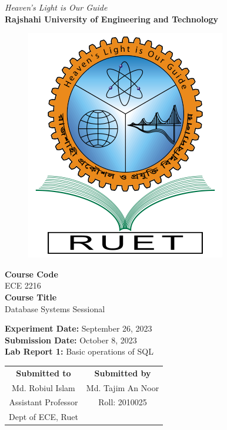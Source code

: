 \vspace*{\fill}
\begin{center}

    \emph{Heaven's Light is Our Guide} \\
    \textbf{Rajshahi University of Engineering and Technology} \\

    \begin{figure}[h]
        \centering
        \includegraphics[scale=.34]{images/RUET_logo.png}
        \label{fig:ruet_logo}
    \end{figure}
    \vspace{5mm}

    \textbf{Course Code}\\
    ECE 2216\\
    \vspace{3mm}
    \textbf{Course Title}\\
    Database Systems Sessional

    \vspace{5mm}
    \textbf{Experiment Date:} September 26, 2023\\
    \textbf{Submission Date:} {October 8, 2023}\\

    \vspace{5mm}
    \textbf{Lab Report 1:} Basic operations of SQL\\

    \vspace{15mm}

    \begin{tabular}{c|c}
        \textbf{Submitted to} & \textbf{Submitted by} \\
        Md. Robiul Islam      & Md. Tajim An Noor     \\
        Assistant Professor   & Roll: 2010025         \\
        Dept of ECE, Ruet     &                       \\
    \end{tabular}

\end{center}
\vspace*{\fill}
